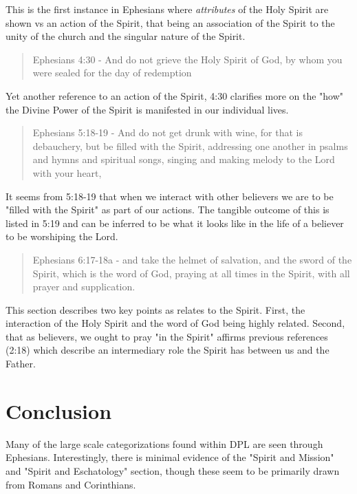 \documentclass[12pt]{turabian-researchpaper}
\begin{document}
\noindent This is the first instance in Ephesians where  \textit{attributes} of the Holy Spirit are shown vs an action of the Spirit, that being an association of the Spirit to the unity of the church and the singular nature of the Spirit.

\begin{quote}
Ephesians 4:30 - And do not grieve the Holy Spirit of God, by whom you were sealed for the day of redemption
\end{quote}

\noindent Yet another reference to an action of the Spirit, 4:30 clarifies more on the "how" the Divine Power of the Spirit is manifested in our individual lives.

\begin{quote}
Ephesians 5:18-19 - And do not get drunk with wine, for that is debauchery, but be filled with the Spirit, addressing one another in psalms and hymns and spiritual songs, singing and making melody to the Lord with your heart,
\end{quote}

\noindent It seems from 5:18-19 that when we interact with other believers we are to be "filled with the Spirit" as part of our actions. The tangible outcome of this is listed in 5:19 and can be inferred to be what it looks like in the life of a believer to be worshiping the Lord.

\begin{quote}
Ephesians 6:17-18a - and take the helmet of salvation, and the sword of the Spirit, which is the word of God,  praying at all times in the Spirit, with all prayer and supplication. 
\end{quote}

\noindent This section describes two key points as relates to the Spirit. First, the interaction of the Holy Spirit and the word of God being highly related. Second, that as believers, we ought to pray "in the Spirit" affirms previous references (2:18) which describe an intermediary role the Spirit has between  us and the Father.

\section{Conclusion}

Many of the large scale categorizations found within DPL are seen through Ephesians. Interestingly, there is minimal evidence of the "Spirit and Mission" and "Spirit and Eschatology" section, though these seem to be primarily drawn from Romans and Corinthians.
\end{document}
